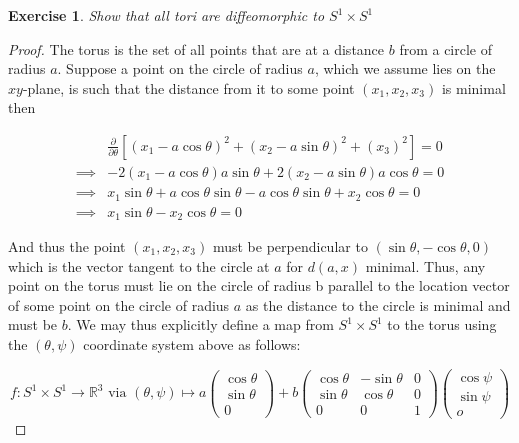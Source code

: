 \documentclass{article}
\newtheorem{exercise}{Exercise}
\begin{document}
  \begin{exercise}
    Show that all tori are diffeomorphic to $S^{1}\times S^{1}$
  \end{exercise}

  \begin{proof}
    The torus is the set of all points that are at a distance $b$ from a circle of radius $a$. Suppose a point on the circle of radius $a$, which we assume lies on the $xy$-plane, is such that the distance from it to some point $(x_{1},x_{2},x_{3})$ is minimal then

    \begin{align*}
      & \frac{\partial}{\partial\theta}[(x_{1}-a\cos\theta)^{2}+(x_{2}-a\sin\theta)^{2}+(x_{3})^{2}] = 0 \\
      \implies & - 2(x_{1}-a\cos\theta)a\sin\theta + 2(x_{2}-a\sin\theta)a\cos\theta = 0 \\
      \implies & x_{1}\sin\theta + a\cos\theta\sin\theta - a\cos\theta\sin\theta + x_{2}\cos\theta = 0 \\
      \implies & x_{1}\sin\theta - x_{2}\cos\theta = 0
    \end{align*}

    And thus the point $(x_{1},x_{2},x_{3})$ must be perpendicular to $(\sin\theta, -\cos\theta,0)$ which is the vector tangent to the circle at $a$ for $d(a,x)$ minimal. Thus, any point on the torus must lie on the circle of radius b parallel to the location vector of some point on the circle of radius $a$ as the distance to the circle is minimal and must be $b$. We may thus explicitly define a map from $S^{1}\times S^{1}$ to the torus using the $(\theta,\psi)$ coordinate system above as follows:

    \[ f: S^{1}\times S^{1} \to \mathbb{R}^{3} \text{ via } (\theta,\psi) \mapsto a\begin{pmatrix} \cos\theta \\ \sin\theta \\ 0 \end{pmatrix} + b\begin{pmatrix}  \cos\theta & -\sin\theta & 0 \\ \sin\theta & \cos\theta & 0 \\  0 & 0 & 1 \end{pmatrix}\begin{pmatrix} \cos\psi \\ \sin\psi \\ o \end{pmatrix} 
    \]


\end{proof}
\end{document}
